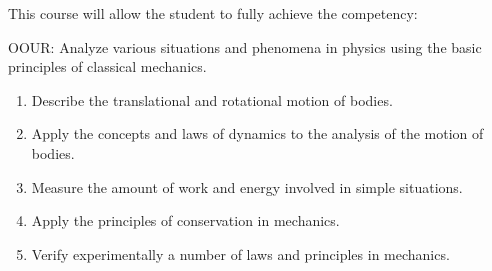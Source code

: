 {This course will allow the student to fully achieve the competency:

OOUR: Analyze various situations and phenomena in physics using the basic principles of classical mechanics.
\begin{enumerate}
\item Describe the translational and rotational motion of bodies.
\item Apply the concepts and laws of dynamics to the analysis of the motion of bodies.
\item Measure the amount of work and energy involved in simple situations.
\item Apply the principles of conservation in mechanics.
\item Verify experimentally a number of laws and principles in mechanics.
\end{enumerate}

%
}
